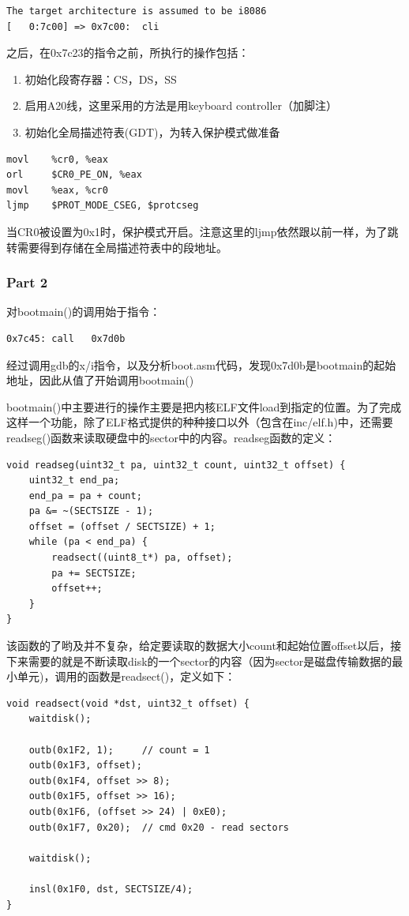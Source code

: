 \begin{lstlisting}
The target architecture is assumed to be i8086
[   0:7c00] => 0x7c00:	cli 
\end{lstlisting}
之后，在0x7c23的指令之前，所执行的操作包括：
\begin{enumerate}
\item 初始化段寄存器：CS，DS，SS
\item 启用A20线，这里采用的方法是用keyboard controller（加脚注）
\item 初始化全局描述符表(GDT)，为转入保护模式做准备
\end{enumerate}

\begin{lstlisting}[language={[x86masm]Assembler}]
movl    %cr0, %eax
orl     $CR0_PE_ON, %eax
movl    %eax, %cr0
ljmp    $PROT_MODE_CSEG, $protcseg
\end{lstlisting}

当CR0被设置为0x1时，保护模式开启。注意这里的ljmp依然跟以前一样，为了跳转需要得到存储在全局描述符表中的段地址。

\subsubsection{Part 2}
对bootmain()的调用始于指令：\\

\begin{lstlisting}[language={[x86masm]Assembler}]
0x7c45:	call   0x7d0b 
\end{lstlisting}

经过调用gdb的x/i指令，以及分析boot.asm代码，发现0x7d0b是bootmain的起始地址，因此从值了开始调用bootmain()

bootmain()中主要进行的操作主要是把内核ELF文件load到指定的位置。为了完成这样一个功能，除了ELF格式提供的种种接口以外（包含在inc/elf.h)中，还需要readseg()函数来读取硬盘中的sector中的内容。readseg函数的定义：\\
\begin{lstlisting}
void readseg(uint32_t pa, uint32_t count, uint32_t offset) {
	uint32_t end_pa;
	end_pa = pa + count;
	pa &= ~(SECTSIZE - 1);
	offset = (offset / SECTSIZE) + 1;
	while (pa < end_pa) {
		readsect((uint8_t*) pa, offset);
		pa += SECTSIZE;
		offset++;
	}
}
\end{lstlisting}

该函数的了哟及并不复杂，给定要读取的数据大小count和起始位置offset以后，接下来需要的就是不断读取disk的一个sector的内容（因为sector是磁盘传输数据的最小单元)，调用的函数是readsect()，定义如下：\\
\begin{lstlisting}
void readsect(void *dst, uint32_t offset) {
	waitdisk();

	outb(0x1F2, 1);		// count = 1
	outb(0x1F3, offset);
	outb(0x1F4, offset >> 8);
	outb(0x1F5, offset >> 16);
	outb(0x1F6, (offset >> 24) | 0xE0);
	outb(0x1F7, 0x20);	// cmd 0x20 - read sectors

	waitdisk();

	insl(0x1F0, dst, SECTSIZE/4);
}
\end{lstlisting}

